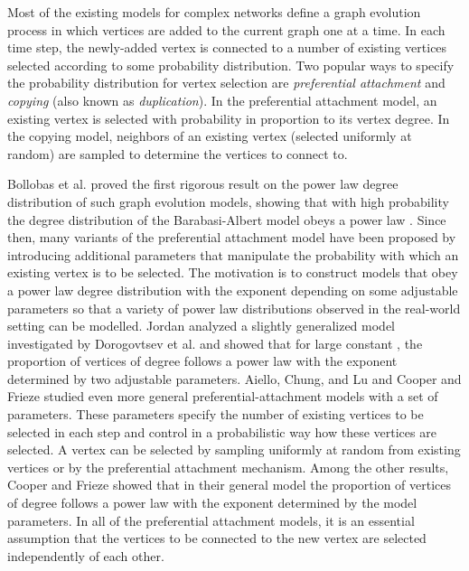 \documentclass[11pt]{article}
\begin{document}
Most of the existing models for complex networks
define a graph evolution process in which vertices are added to the current graph one at a time.
In each time step, the newly-added vertex is connected to
a number of existing vertices selected according to some probability distribution.
Two popular ways to specify the probability distribution for vertex selection are \textit{preferential attachment}
and \textit{copying}
(also known as \textit{duplication}). In the preferential attachment model, an existing vertex is selected with probability
in proportion to its vertex degree. In the copying model, neighbors of an existing vertex (selected uniformly at random) are
sampled to determine the vertices to connect to.


Bollobas et al. \cite{bollobas01scalefree}  proved the first rigorous result on the power law degree distribution of such
graph evolution models, showing that with high probability the degree distribution of the Barabasi-Albert model \cite{albert02complex}
obeys a power law .
Since then, many variants of the preferential attachment model have been proposed
by introducing additional parameters that manipulate the probability with which an existing vertex is to be selected. The motivation
is to construct models that obey a power law degree distribution with the exponent depending on some adjustable parameters so that
a variety of power law distributions observed in the real-world setting can be modelled.
Jordan \cite{jordan06} analyzed a slightly generalized model investigated by Dorogovtsev et al. \cite{dorog00}
and showed that for large constant , the proportion of vertices of  degree 
follows a power law  with the exponent  determined by two adjustable parameters.
Aiello, Chung, and Lu \cite{aiello01} and Cooper and Frieze \cite{cooper03} studied even more general
preferential-attachment  models with a set of parameters. These parameters specify the number of existing vertices to be selected in each step and control in a
probabilistic way how these vertices are selected. A vertex can be selected by sampling uniformly at random from existing vertices or by the preferential attachment mechanism.
Among the other results, Cooper and Frieze showed that in their general model the proportion of vertices of degree  follows a power law with the
exponent  determined by the model parameters. In all of the preferential attachment
models, it is an essential assumption that the vertices to be connected to the new vertex are selected independently of each other.
\end{document}
